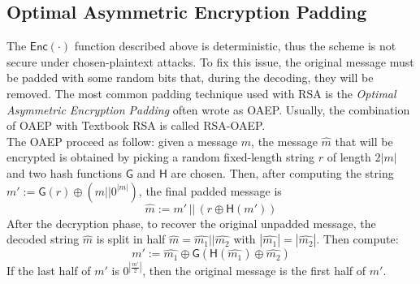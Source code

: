 \subsection{Optimal Asymmetric Encryption Padding}
The $\mathsf{Enc(\cdot)}$ function described above is deterministic, thus the scheme is not secure under chosen-plaintext attacks. To fix this issue, the original message must be padded with some random bits that, during the decoding, they will be removed. The most common padding technique used with RSA is the \emph{Optimal Asymmetric Encryption Padding} often wrote as OAEP. Usually, the combination of OAEP with Textbook RSA is called RSA-OAEP.\\
The OAEP proceed as follow: given a message $m$, the message $\hat{m}$ that will be encrypted is obtained by picking a random fixed-length string $r$ of length $2|m|$ and two hash functions $\mathsf{G}$ and $\mathsf{H}$ are chosen. Then, after computing the string $m' := \mathsf{G}(r) \oplus (m||0^{|m|})$, the final padded message is
$$
    \hat{m} := m' \, || \, (r \oplus \mathsf{H}(m'))
$$
After the decryption phase, to recover the original unpadded message, the decoded string $\hat{m}$ is split in half $\hat{m} = \hat{m_1}||\hat{m_2}$ with $|\hat{m_1}|=|\hat{m_2}|$. Then compute:
$$
    m' := \hat{m_1} \oplus \mathsf{G}(\mathsf{H}(\hat{m_1}) \oplus \hat{m_2})
$$
If the last half of $m'$ is $0^{|\frac{m'}{2}|}$, then the original message is the first half of $m'$.

